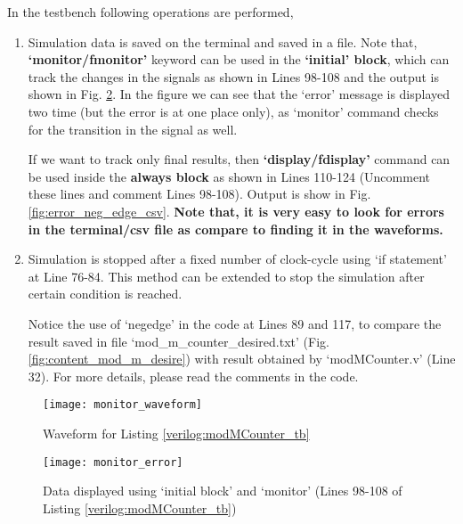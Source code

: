 \begin{explanation}
	In the testbench following operations are performed, 
	\begin{enumerate}
		\item Simulation data is saved on the terminal and saved in a file. Note that, \textbf{`monitor/fmonitor'} keyword can be used in the \textbf{`initial' block}, which can track the changes in the signals as shown in Lines 98-108 and the output is shown in Fig. \ref{fig:monitor_error}. In the figure we can see that the `error' message is displayed two time (but the error is at one place only), as `monitor' command checks for the transition in the signal as well. 
		
		If we want to track only final results, then \textbf{`display/fdisplay'} command can be used inside the \textbf{always block} as shown in Lines 110-124 (Uncomment these lines and comment Lines 98-108). Output is show in Fig. \ref{fig:error_neg_edge_csv}. \textbf{Note that, it is very easy to look for errors in the terminal/csv file as compare to finding it in the waveforms.} 
		
		\item Simulation is stopped after a fixed number of clock-cycle using `if statement' at Line 76-84. This method can be extended to stop the simulation after certain condition is reached.
		
		\begin{noNumBox}
			Notice the use of `negedge' in the code at Lines 89 and 117, to compare the result saved in file `mod\_m\_counter\_desired.txt' (Fig. \ref{fig:content_mod_m_desire}) with result obtained by `modMCounter.v' (Line 32). For more details, please read the comments in the code. 
		\end{noNumBox}
	\end{enumerate}
	
	
	\begin{figure}[!h]
		\centering
		\texttt{[image: monitor\_waveform]}
		\caption{Waveform for Listing \ref{verilog:modMCounter_tb}}
		\label{fig:monitor_waveform}
	\end{figure}
	
	\begin{figure}[!h]
		\centering
		\texttt{[image: monitor\_error]}
		\caption{Data displayed using `initial block' and `monitor' (Lines 98-108 of Listing \ref{verilog:modMCounter_tb})}
		\label{fig:monitor_error}
	\end{figure}
	

\end{explanation}
